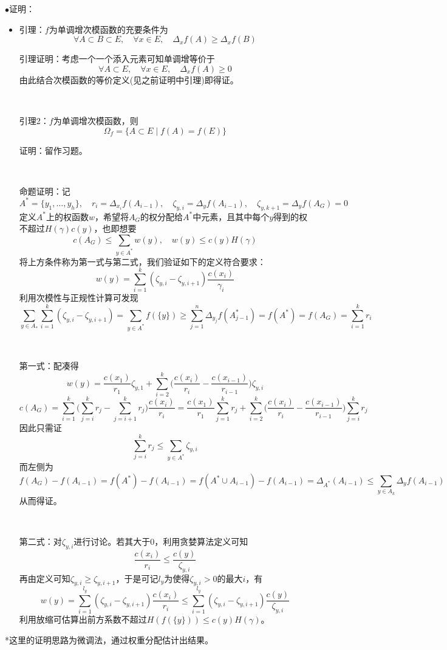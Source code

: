\documentclass[a4paper,UTF8,fontset=windows]{ctexart}
\newcommand{\proo}[1]{{\kaishu $\bullet$证明：
\begin{itemize}
    \item[] #1
\end{itemize}
}}
\begin{document}
\proo{
    引理：$f$为单调增次模函数的充要条件为
    $$\forall A\subset B\subset E,\quad\forall x\in E,\quad\Delta_xf(A)\ge\Delta_xf(B)$$
    
    引理证明：考虑一个一个添入元素可知单调增等价于
    $$\forall A\subset E,\quad\forall x\in E,\quad\Delta_xf(A)\ge0$$
    由此结合次模函数的等价定义(见之前证明中引理)即得证。

    \

    引理2：$f$为单调增次模函数，则
    $$\Omega_f=\{A\subset E\mid f(A)=f(E)\}$$

    证明：留作习题。

    \

    命题证明：记
    $$A^*=\{y_1,\dots,y_h\},\quad r_i=\Delta_{x_i}f(A_{i-1}),\quad\zeta_{y,i}=\Delta_yf(A_{i-1}),\quad\zeta_{y,k+1}=\Delta_yf(A_G)=0$$
    定义$A^*$上的权函数$w$，希望将$A_G$的权分配给$A^*$中元素，且其中每个$y$得到的权不超过$H(\gamma)c(y)$，也即想要
    $$c(A_G)\le\sum_{y\in A^*}w(y),\quad w(y)\le c(y)H(\gamma)$$
    将上方条件称为第一式与第二式，我们验证如下的定义符合要求：
    $$w(y)=\sum_{i=1}^k(\zeta_{y,i}-\zeta_{y,i+1})\frac{c(x_i)}{\gamma_i}$$
    利用次模性与正规性计算可发现
    $$\sum_{y\in A_*}\sum_{i=1}^k(\zeta_{y,i}-\zeta_{y,i+1})=\sum_{y\in A^*}f(\{y\})\ge\sum_{j=1}^n\Delta_{y_j}f(A^*_{j-1})=f(A^*)=f(A_G)=\sum_{i=1}^kr_i$$

    \

    第一式：配凑得
    $$w(y)=\frac{c(x_1)}{r_1}\zeta_{y,1}+\sum_{i=2}^k\bigg(\frac{c(x_i)}{r_i}-\frac{c(x_{i-1})}{r_{i-1}}\bigg)\zeta_{y,i}$$
    $$c(A_G)=\sum_{i=1}^k\bigg(\sum_{j=i}^kr_j-\sum_{j=i+1}^kr_j\bigg)\frac{c(x_i)}{r_i}=\frac{c(x_1)}{r_1}\sum_{j=1}^kr_j+\sum_{i=2}^k\bigg(\frac{c(x_i)}{r_i}-\frac{c(x_{i-1})}{r_{i-1}}\bigg)\sum_{j=i}^kr_j$$
    因此只需证
    $$\sum_{j=i}^kr_j\le\sum_{y\in A^*}\zeta_{y,i}$$
    而左侧为
    $$f(A_G)-f(A_{i-1})=f(A^*)-f(A_{i-1})=f(A^*\cup A_{i-1})-f(A_{i-1})=\Delta_{A^*}(A_{i-1})\le\sum_{y\in A_k}\Delta_yf(A_{i-1})$$
    从而得证。

    \

    第二式：对$\zeta_{y,i}$进行讨论。若其大于0，利用贪婪算法定义可知
    $$\frac{c(x_i)}{r_i}\le\frac{c(y)}{\zeta_{y,i}}$$
    再由定义可知$\zeta_{y,i}\ge\zeta_{y,i+1}$，于是可记$l_y$为使得$\zeta_{y,i}>0$的最大$i$，有
    $$w(y)=\sum_{i=1}^{l_y}(\zeta_{y,i}-\zeta_{y,i+1})\frac{c(x_i)}{r_i}\le\sum_{i=1}^{l_y}(\zeta_{y,i}-\zeta_{y,i+1})\frac{c(y)}{\zeta_{y,i}}$$
    利用放缩可估算出前方系数不超过$H(f(\{y\}))\le c(y)H(\gamma)$。
}

*这里的证明思路为微调法，通过权重分配估计出结果。
\end{document}
